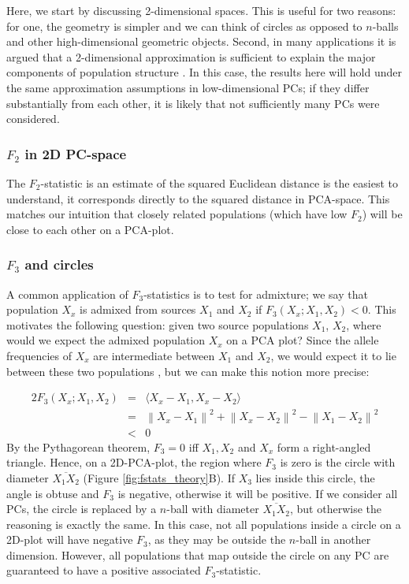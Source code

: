 \documentclass[12pt,a4pape, fullpage]{article}
\newcommand{\normsq}[1]{\left\lVert#1\right\rVert^2}
\begin{document}
Here, we start by discussing 2-dimensional spaces. This is useful for two reasons: for one, the geometry is simpler and we can think of circles as opposed to $n$-balls and other high-dimensional geometric objects. Second, in many applications it is argued that a 2-dimensional approximation is sufficient to explain the major components of population structure \cite[e.g.][]{novembre2008}. In this case, the results here will hold under the same approximation assumptions in low-dimensional PCs; if they differ substantially from each other, it is likely that not sufficiently many PCs were considered.


\subsubsection{$F_2$ in 2D PC-space}
The $F_2$-statistic is an estimate of the squared Euclidean distance is the easiest to understand, it corresponds directly to the squared distance in PCA-space. This matches our intuition that closely related populations (which have low $F_2$) will be close to each other on a PCA-plot.


\subsubsection{$F_3$ and circles}
A common application of $F_3$-statistics is to test for admixture; we say that population $X_x$ is admixed from sources $X_1$ and $X_2$ if $F_3(X_x; X_1, X_2) < 0$. This motivates the following question: given two source populations $X_1$, $X_2$, where would we expect the admixed population $X_x$ on a PCA plot? Since the allele frequencies of $X_x$ are intermediate between $X_1$ and $X_2$, we would expect it to lie between these two populations \cite{brisbin2012, mcvean2009}, but we can make this notion more precise:

\begin{eqnarray}
2 F_3(X_x; X_1, X_2) &=& \langle  X_x - X_1, X_x - X_2 \rangle \nonumber\\
      &=& \normsq{X_x - X_1} + \normsq{X_x - X_2}  - \normsq{X_1 - X_2} \nonumber\\
      &<&0
\end{eqnarray}
By the Pythagorean theorem, $F_3 = 0 $ iff $X_1, X_2$ and $X_x$ form a right-angled triangle. Hence, on a 2D-PCA-plot, the region where $F_3$ is zero is the circle with diameter $\overline{X_1X_2}$ (Figure \ref{fig:fstats_theory}B). If $X_3$ lies inside this circle, the angle is obtuse and $F_3$ is negative, otherwise it will be positive. If we consider all PCs, the circle is replaced by a $n$-ball with diameter $\overline{X_1X_2}$, but otherwise the reasoning is exactly the same. In this case, not all populations inside a circle on a 2D-plot will have negative $F_3$, as they may be outside the $n$-ball in another dimension. However, all populations that map outside the circle on any PC are guaranteed to have a positive associated $F_3$-statistic.
\end{document}
